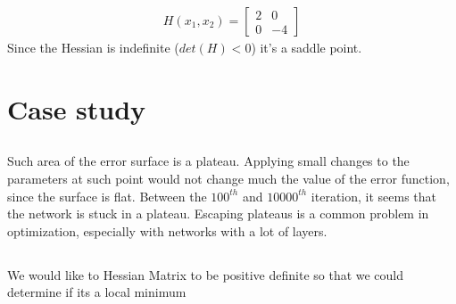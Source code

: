 \documentclass[12pt]{article}
\begin{document}
\begin{align}
H(x_1,x_2) = \begin{bmatrix}
2 & 0 \\
0 & -4
\end{bmatrix}
\end{align}
Since the Hessian is indefinite ($det(H) <0$) it's a saddle point.

\section{Case study}
\subsection{}
Such area of the error surface is a plateau. Applying small changes to the parameters at such point would not change much the value of the error function, since the surface is flat.
Between the $100^{th}$ and $10000^{th}$ iteration, it seems that the network is stuck in a plateau. Escaping plateaus is a common problem in optimization, especially with networks with a lot of layers.
\subsection{}
We would like to Hessian Matrix to be positive definite so that we could determine if its a local minimum
\end{document}
